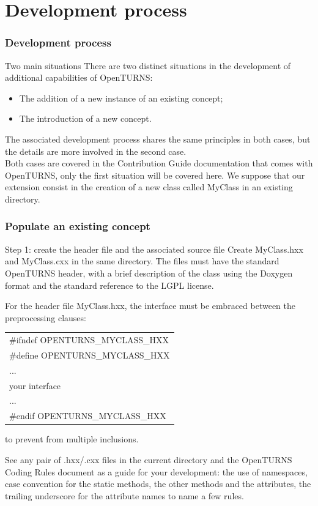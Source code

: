 \documentclass[8pt]{beamer}
\begin{document}
\section[Development process]{Development process}
\begin{frame}
  \frametitle{Development process}
  \begin{block}{Two main situations}
    There are two distinct situations in the development of additional capabilities of OpenTURNS:
    \begin{itemize}
      \item The addition of a new instance of an existing concept;
      \item The introduction of a new concept.
    \end{itemize}
    The associated development process shares the same principles in both cases, but the details are more involved in the second case.\\
    Both cases are covered in the \alert{Contribution Guide} documentation that comes with OpenTURNS, only the first situation will be covered here. We suppose that our extension consist in the creation of a new class called MyClass in an existing directory.
  \end{block}
\end{frame}
\begin{frame}
  \frametitle{Populate an existing concept}
  \begin{block}{Step 1: create the header file and the associated source file}
    Create MyClass.hxx and MyClass.cxx in the same directory. The files must have the standard OpenTURNS header, with a brief description of the class using the Doxygen format and the standard reference to the LGPL license.
  
  For the header file MyClass.hxx, the interface must be embraced between the preprocessing clauses:
  
\begin{tabular}{l}
\ttfamily \#ifndef OPENTURNS\_MYCLASS\_HXX\\
\ttfamily \#define OPENTURNS\_MYCLASS\_HXX\\
\ttfamily ...\\
\ttfamily your interface\\
\ttfamily ...\\
\ttfamily \#endif OPENTURNS\_MYCLASS\_HXX
\end{tabular}
  
  to prevent from multiple inclusions.
  
  See any pair of .hxx/.cxx files in the current directory and the OpenTURNS Coding Rules document as a guide for your development: the use of namespaces, case convention for the static methods, the other methods and the attributes, the trailing underscore for the attribute names to name a few rules.
  \end{block}
\end{frame}
\end{document}
